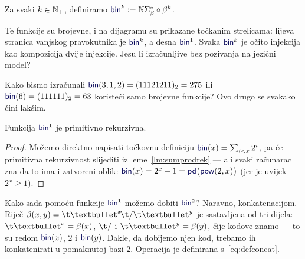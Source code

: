 \begin{definicija}[{name=[binarno kodiranje --- prateća funkcija binarne reprezentacije]}]\label{def:bink}
Za svaki $k\in{\mathbb N}_+$, definiramo $\f{bin}^k:=\N\Sigma_\beta^*\circ\beta^k$.
\end{definicija}

Te funkcije su brojevne, i na dijagramu su prikazane točkanim strelicama: lijeva stranica vanjskog pravokutnika je $\f{bin}^k$, a desna $\f{bin}^1$. Svaka $\f{bin}^k$ je očito injekcija kao kompozicija dvije injekcije. Jesu li izračunljive bez pozivanja na jezični model? %

Kako bismo izračunali $\f{bin}(3,1,2)=(11121211)_2=275$ ili $\f{bin}(6)=(111111)_2=63$ koristeći samo brojevne funkcije? Ovo drugo se svakako čini lakšim.

\begin{lema}[{name=[primitivna rekurzivnost jednomjesnog binarnog kodiranja]}]\label{lm:bin1prn}
Funkcija $\f{bin}^1$\! je primitivno rekurzivna.
\end{lema}
\begin{proof}
Možemo direktno napisati točkovnu definiciju $\f{bin}(x)=\sum_{i<x}2^i$, pa će primitivna rekurzivnost slijediti iz leme~\ref{lm:sumprodrek} --- ali svaki računarac zna da to ima i zatvoreni oblik:
$\f{bin}(x)=2^x-1=\f{pd}\bigl(\f{pow}(2,x)\bigr)$ (jer je uvijek $2^x\ge 1$).
\end{proof}

Kako sada pomoću funkcije $\f{bin}^1$ možemo dobiti $\f{bin}^2$? Naravno, konkatenacijom. Riječ $\beta(x,y)=\t\textbullet^x\!\t/\t\textbullet^y$ je sastavljena od tri dijela: $\t\textbullet^x=\beta(x)$, $\t/$ i $\t\textbullet^y=\beta(y)$, čije kodove znamo --- to su redom $\f{bin}(x)$, $2$ i $\f{bin}(y)$. Dakle, da dobijemo njen kod, trebamo ih konkatenirati u pomaknutoj bazi $2$. Operacija je definirana s~\eqref{eq:defconcat}.

